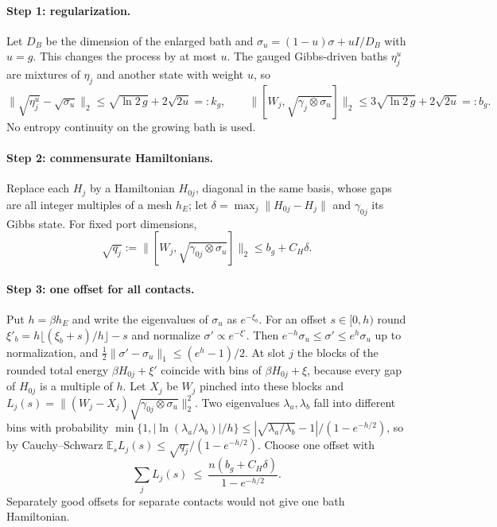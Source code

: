 \documentclass[11pt]{article}
\theoremstyle{definition}
\theoremstyle{remark}
\begin{document}
\paragraph{Step 1: regularization.} Let $D_B$ be the dimension of the enlarged bath and $\sigma_u=(1-u)\sigma+uI/D_B$ with $u=g$. This changes the process by at most $u$. The gauged Gibbs-driven baths $\eta_j^u$ are mixtures of $\eta_j$ and another state with weight $u$, so
\[
\|\sqrt{\eta_j^u}-\sqrt{\sigma_u}\|_2\le\sqrt{\ln2\,g}+2\sqrt{2u}=:k_g,\qquad \bigl\|[W_j,\sqrt{\gamma_j\otimes\sigma_u}]\bigr\|_2\le3\sqrt{\ln2\,g}+2\sqrt{2u}=:b_g.
\]
No entropy continuity on the growing bath is used.

\paragraph{Step 2: commensurate Hamiltonians.} Replace each $H_j$ by a Hamiltonian $H_{0j}$, diagonal in the same basis, whose gaps are all integer multiples of a mesh $h_E$; let $\delta=\max_j\|H_{0j}-H_j\|$ and $\gamma_{0j}$ its Gibbs state. For fixed port dimensions,
\[
\sqrt{q_j}:=\bigl\|[W_j,\sqrt{\gamma_{0j}\otimes\sigma_u}]\bigr\|_2\le b_g+C_H\delta.
\]

\paragraph{Step 3: one offset for all contacts.} Put $h=\beta h_E$ and write the eigenvalues of $\sigma_u$ as $e^{-\xi_b}$. For an offset $s\in[0,h)$ round $\xi'_b=h\lfloor(\xi_b+s)/h\rfloor-s$ and normalize $\sigma'\propto e^{-\xi'}$. Then $e^{-h}\sigma_u\le\sigma'\le e^h\sigma_u$ up to normalization, and $\frac12\|\sigma'-\sigma_u\|_1\le(e^h-1)/2$. At slot $j$ the blocks of the rounded total energy $\beta H_{0j}+\xi'$ coincide with bins of $\beta H_{0j}+\xi$, because every gap of $H_{0j}$ is a multiple of $h$. Let $X_j$ be $W_j$ pinched into these blocks and $L_j(s)=\|(W_j-X_j)\sqrt{\gamma_{0j}\otimes\sigma_u}\|_2^2$. Two eigenvalues $\lambda_a,\lambda_b$ fall into different bins with probability $\min\{1,|\ln(\lambda_a/\lambda_b)|/h\}\le|\sqrt{\lambda_a/\lambda_b}-1|/(1-e^{-h/2})$, so by Cauchy--Schwarz $\mathbb E_sL_j(s)\le\sqrt{q_j}/(1-e^{-h/2})$. Choose one offset with
\begin{equation}\label{eq:offset}
\sum_jL_j(s)\ \le\ \frac{n(b_g+C_H\delta)}{1-e^{-h/2}}.
\end{equation}
Separately good offsets for separate contacts would not give one bath Hamiltonian.
\end{document}

